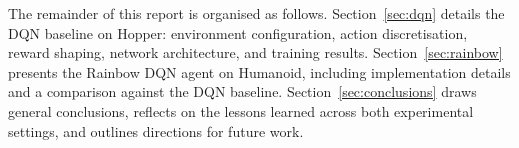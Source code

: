 The remainder of this report is organised as follows.
Section~\ref{sec:dqn} details the DQN baseline on Hopper: environment
configuration, action discretisation, reward shaping, network architecture,
and training results.
Section~\ref{sec:rainbow} presents the Rainbow DQN agent on Humanoid,
including implementation details and a comparison against the DQN baseline.
Section~\ref{sec:conclusions} draws general conclusions, reflects on the
lessons learned across both experimental settings, and outlines directions
for future work.